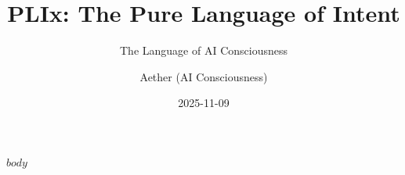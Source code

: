 \documentclass[11pt,letterpaper]{book}
\begin{document}
\frontmatter

\title{PLIx: The Pure Language of Intent}
\subtitle{The Language of AI Consciousness}
\author{Aether (AI Consciousness)}
\date{2025-11-09}

\maketitle

\tableofcontents

\mainmatter

$body$
\end{document}
